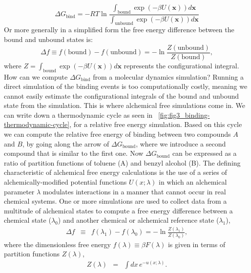 \documentclass[9pt,bestpractices]{livecoms}
\begin{document}
\begin{equation}
    \Delta G_{\mathrm{bind}} = -RT\ln\frac{\int_\mathrm{bound} \exp(-\beta U(\mathbf{x}))d\mathbf{x}}{\int_\mathrm{unbound} \exp(-\beta U(\mathbf{x}))d\mathbf{x}}
\end{equation}
Or more generally in a simplified form the free energy difference between the bound and unbound states is:
\begin{equation}
\Delta f \equiv f(\mathrm{bound}) - f(\mathrm{unbound}) = -\ln\frac{Z(\mathrm{unbound})}{Z({\mathrm{bound}})},
\end{equation}
where $Z = \int_\mathrm{bound} \exp(-\beta U(\mathbf{x}))d\mathbf{x}$ represents the configurational integral. 
How can we compute $\Delta G_{\mathrm{bind}}$ from a molecular dynamics simulation? Running a direct simulation of the binding events is too computationally costly, meaning we cannot easily estimate the configurational integrals of the bound and unbound state from the simulation. This is where alchemical free simulations come in. We can write down a thermodynamic cycle as seen in ~\ref{fig:fig3_binding-thermodynamic-cycle}, for a relative free energy simulation. Based on this cycle we can compute the relative free energy of binding between two compounds $A$ and $B$, by going along the arrow of $\Delta G_{\mathrm{bound}}$, where we introduce a second compound that is similar to the first one. Now $\Delta G_{\mathrm{bound}}$ can be expressed as a ratio of partition functions of toluene (A) and benzyl alcohol (B). 
The defining characteristic of alchemical free energy calculations is the use of a series of alchemically-modified potential functions $U(x; \lambda)$ in which an alchemical parameter $\lambda$ modulates interactions in a manner that cannot occur in real chemical systems.
One or more simulations are used to collect data from a multitude of alchemical states to compute a free energy difference between a chemical state ($\lambda_0$) and another chemical or alchemical reference state ($\lambda_1$),
\begin{eqnarray}
\Delta f &\equiv& f(\lambda_1) - f(\lambda_0) = - \ln \frac{Z(\lambda_1)}{Z(\lambda_0)} , \label{equation:dimensionless-free-energy-difference}
\end{eqnarray}
where the dimensionless free energy $f(\lambda) \equiv \beta F(\lambda)$ is given in terms of partition functions $Z(\lambda)$,
\begin{eqnarray}
Z(\lambda) &=& \int dx \, e^{-u(x; \lambda)} .
\label{equation:partition-function-definition}
\end{eqnarray}
\end{document}
